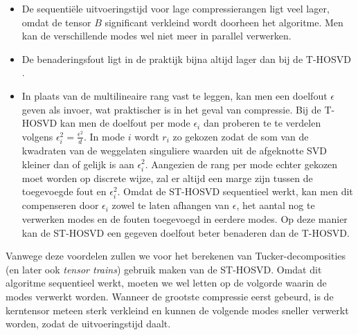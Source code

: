 \begin{itemize}
\item De sequenti\"ele uitvoeringstijd voor lage compressierangen ligt veel lager, omdat de tensor $B$ significant verkleind wordt doorheen het algoritme. Men kan de verschillende modes wel niet meer in parallel verwerken.
\item De benaderingsfout ligt in de praktijk bijna altijd lager dan bij de T-HOSVD \cite{ref:st_hosvd}.
\item In plaats van de multilineaire rang vast te leggen, kan men een doelfout $\epsilon$ geven als invoer, wat praktischer is in het geval van compressie. Bij de T-HOSVD kan men de doelfout per mode $\epsilon_i$ dan proberen te te verdelen volgens $\epsilon_i^2 = \frac{\epsilon^2}{d}$. In mode $i$ wordt $r_i$ zo gekozen zodat de som van de kwadraten van de weggelaten singuliere waarden uit de afgeknotte SVD kleiner dan of gelijk is aan $\epsilon_i^2$. Aangezien de rang per mode echter gekozen moet worden op discrete wijze, zal er altijd een marge zijn tussen de toegevoegde fout en $\epsilon_i^2$. Omdat de ST-HOSVD sequentieel werkt, kan men dit compenseren door $\epsilon_i$ zowel te laten afhangen van $\epsilon$, het aantal nog te verwerken modes en de fouten toegevoegd in eerdere modes. Op deze manier kan de ST-HOSVD een gegeven doelfout beter benaderen dan de T-HOSVD.
\end{itemize}

Vanwege deze voordelen zullen we voor het berekenen van Tucker-decomposities (en later ook \textit{tensor trains}) gebruik maken van de ST-HOSVD. Omdat dit algoritme sequentieel werkt, moeten we wel letten op de volgorde waarin de modes verwerkt worden. Wanneer de grootste compressie eerst gebeurd, is de kerntensor meteen sterk verkleind en kunnen de volgende modes sneller verwerkt worden, zodat de uitvoeringstijd daalt.